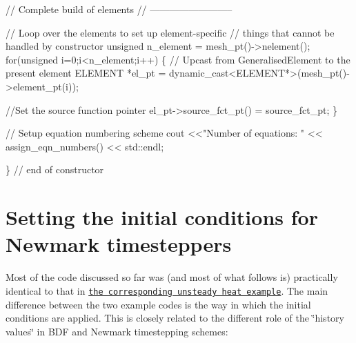 \begin{DoxyCodeInclude}

 \textcolor{comment}{// Complete build of elements}
 \textcolor{comment}{// --------------------------}

 \textcolor{comment}{// Loop over the elements to set up element-specific }
 \textcolor{comment}{// things that cannot be handled by constructor }
\textcolor{keywordtype}{unsigned} n\_element = mesh\_pt()->nelement();
\textcolor{keywordflow}{for}(\textcolor{keywordtype}{unsigned} i=0;i<n\_element;i++)
  \{
   \textcolor{comment}{// Upcast from GeneralisedElement to the present element}
   ELEMENT *el\_pt = \textcolor{keyword}{dynamic\_cast<}ELEMENT*\textcolor{keyword}{>}(mesh\_pt()->element\_pt(i));

   \textcolor{comment}{//Set the source function pointer}
   el\_pt->source\_fct\_pt() = source\_fct\_pt;
  \}

 \textcolor{comment}{// Setup equation numbering scheme}
 cout <<\textcolor{stringliteral}{"Number of equations: "} << assign\_eqn\_numbers() << std::endl; 

\} \textcolor{comment}{// end of constructor}

\end{DoxyCodeInclude}




 

\hypertarget{index_IC}{}\section{Setting the initial conditions for Newmark timesteppers}\label{index_IC}
Most of the code discussed so far was (and most of what follows is) practically identical to that in \href{../../../unsteady_heat/two_d_unsteady_heat/html/index.html}{\tt the corresponding unsteady heat example}. The main difference between the two example codes is the way in which the initial conditions are applied. This is closely related to the different role of the \char`\"{}history values\char`\"{} in {\ttfamily B\+DF} and {\ttfamily Newmark} timestepping schemes\+:



